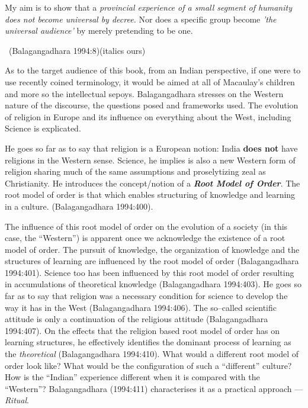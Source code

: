\begin{myquote}
My aim is to show that a \textit{provincial experience of a small segment of humanity does not become universal by decree.} Nor does a specific group become \textit{'the universal audience'} by merely pretending to be one. 

~\hfill (Balagangadhara 1994:8)(italics ours)
\end{myquote}

As to the target audience of this book, from an Indian perspective, if one were to use recently coined terminology, it would be aimed at all of Macaulay's children and more so the intellectual sepoys. Balagangadhara stresses on the Western nature of the discourse, the questions posed and frameworks used. The evolution of religion in Europe and its influence on everything about the West, including Science is explicated.

He goes so far as to say that religion is a European notion: India \textbf{does not} have religions in the Western sense. Science, he implies is also a new Western form of religion sharing much of the same assumptions and proselytizing zeal as Christianity. He introduces the concept/notion of a \textbf{\textit{Root Model of Order}}. The root model of order is that which enables structuring of knowledge and learning in a culture. (Balagangadhara 1994:400).

The influence of this root model of order on the evolution of a society (in this case, the “Western”) is apparent once we acknowledge the existence of a root model of order. The pursuit of knowledge, the organization of knowledge and the structures of learning are influenced by the root model of order (Balagangadhara 1994:401). Science too has been influenced by this root model of order resulting in accumulations of theoretical knowledge (Balagangadhara 1994:403). He goes so far as to say that religion was a necessary condition for science to develop the way it has in the West (Balagangadhara 1994:406). The so–called scientific attitude is only a continuation of the religious attitude (Balagangadhara 1994:407). On the effects that the religion based root model of order has on learning structures, he effectively identifies the dominant process of learning as the \textit{theoretical} (Balagangadhara 1994:410). What would a different root model of order look like? What would be the configuration of such a “different” culture? How is the “Indian” experience different when it is compared with the “Western”? Balagangadhara (1994:411) characterises it as a practical approach — \textit{Ritual}.

